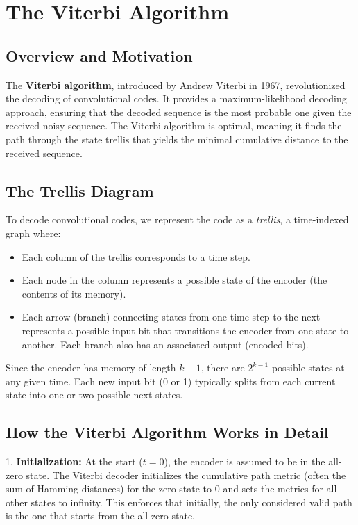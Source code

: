 \documentclass[12pt,a4paper]{article}
\begin{document}
\section{The Viterbi Algorithm}

\subsection{Overview and Motivation}

The \textbf{Viterbi algorithm}, introduced by Andrew Viterbi in 1967, revolutionized the decoding of convolutional codes. It provides a maximum-likelihood decoding approach, ensuring that the decoded sequence is the most probable one given the received noisy sequence. The Viterbi algorithm is optimal, meaning it finds the path through the state trellis that yields the minimal cumulative distance to the received sequence.

\subsection{The Trellis Diagram}

To decode convolutional codes, we represent the code as a \emph{trellis}, a time-indexed graph where:
\begin{itemize}
    \item Each column of the trellis corresponds to a time step.
    \item Each node in the column represents a possible state of the encoder (the contents of its memory).
    \item Each arrow (branch) connecting states from one time step to the next represents a possible input bit that transitions the encoder from one state to another. Each branch also has an associated output (encoded bits).
\end{itemize}

Since the encoder has memory of length $k-1$, there are $2^{k-1}$ possible states at any given time. Each new input bit (0 or 1) typically splits from each current state into one or two possible next states.

\subsection{How the Viterbi Algorithm Works in Detail}

1. \textbf{Initialization:}  
   At the start ($t=0$), the encoder is assumed to be in the all-zero state. The Viterbi decoder initializes the cumulative path metric (often the sum of Hamming distances) for the zero state to 0 and sets the metrics for all other states to infinity. This enforces that initially, the only considered valid path is the one that starts from the all-zero state.
\end{document}
